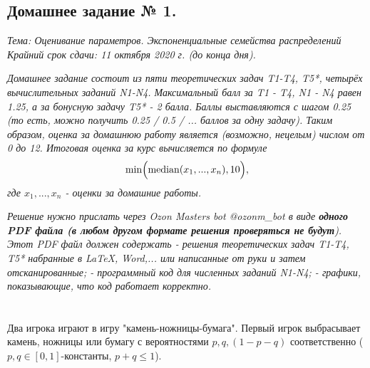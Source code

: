 \documentclass[12pt]{article}
\begin{document}
\hspace{10cm}
\begin{center}
\section*{%
Домашнее задание № 1.}
\end{center}
\textit{Тема: Оценивание параметров. Экспоненциальные семейства распределений }\newline \newline
\textit{Крайний срок сдачи: 11 октября 2020 г. (до конца дня).}\newline \newline

\textit{Домашнее задание состоит из пяти теоретических задач T1-T4, T5*, четырёх вычислительных заданий N1-N4.  Максимальный балл за  T1 - T4, N1 - N4  равен 1.25, а за бонусную задачу   T5* - 2 балла. Баллы выставляются с шагом 0.25 (то есть, можно получить 0.25 / 0.5 / ... баллов за одну задачу). Таким образом, оценка за домашнюю работу является (возможно, нецелым) числом от 0 до 12. \newline\newline
Итоговая оценка за курс вычисляется по формуле 
\begin{eqnarray*}
\min\Bigl( 
  \operatorname{median}(x_1, ..., x_n), 10 
\Bigr),
\end{eqnarray*}
где \(x_1,...,x_n\) - оценки за домашние работы.\newline
}


\textit{Решение нужно прислать через Ozon Masters bot  @ozonm\_bot в виде \textbf{одного PDF файла (в любом другом формате решения проверяться не будут}). Этот PDF файл должен содержать \newline
 - решения теоретических задач T1-T4, T5* набранные в LaTeX, Word,... или написанные от руки и затем отсканированные;\newline
 - программный код для численных заданий N1-N4;\newline
 - графики, показывающие, что код работает корректно. }
\newpage
\section{}
Два игрока играют в игру "камень-ножницы-бумага". Первый игрок выбрасывает камень, ножницы или бумагу с вероятностями \(p, q, (1-p-q)\) соответственно  (\(p,q \in [0,1]\)-константы, \(p+q\leq 1\)).
\end{document}
